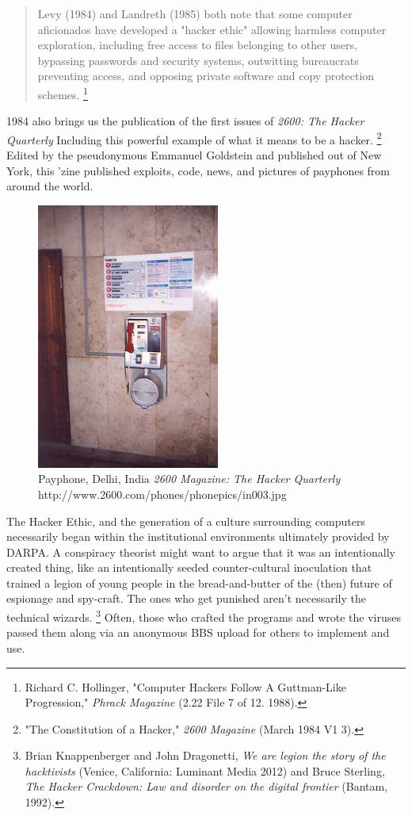 \documentclass[11pt]{article}
\begin{document}
\begin{quote}
Levy (1984) and Landreth (1985) both note that some computer aficionados have
developed a "hacker ethic" allowing harmless computer exploration, including
free access to files belonging to other users, bypassing passwords and security
systems, outwitting bureaucrats preventing access, and opposing private
software and copy protection schemes.
\footnote{Richard C. Hollinger, "Computer Hackers Follow A Guttman-Like Progression,"  \emph{Phrack Magazine} (2.22 File 7 of 12. 1988).}
\end{quote}

1984 also brings us the publication of the first issues of \emph{2600: The Hacker Quarterly} Including this powerful example of what it means to be a hacker.
\footnote{"The Constitution of a Hacker," \emph{2600 Magazine} (March 1984 V1 3).}
Edited by the pseudonymous Emmanuel Goldstein and published out of New York, this 'zine published exploits, code, news, and pictures of payphones from around the world.

\begin{figure}[ht!]
\center
\includegraphics[width=60mm]{in003.jpg}
\caption{Payphone, Delhi, India \emph{2600 Magazine: The Hacker Quarterly} http://www.2600.com/phones/phonepics/in003.jpg}
\end{figure}

The Hacker Ethic, and the generation of a culture surrounding computers necessarily began within the institutional environments ultimately provided by DARPA. A conspiracy theorist might want to argue that it was an intentionally created thing, like an intentionally seeded counter-cultural inoculation that trained a legion of young people in the bread-and-butter of the (then) future of espionage and spy-craft. The ones who get punished aren't necessarily the technical wizards.
\footnote{Brian Knappenberger and John Dragonetti, \emph{We are legion the story of the hacktivists} (Venice, California: Luminant Media 2012) and Bruce Sterling, \emph{The Hacker Crackdown: Law and disorder on the digital frontier} (Bantam, 1992).} 
Often, those who crafted the programs and wrote the viruses passed them along via an anonymous BBS upload for others to implement and use.
\end{document}

